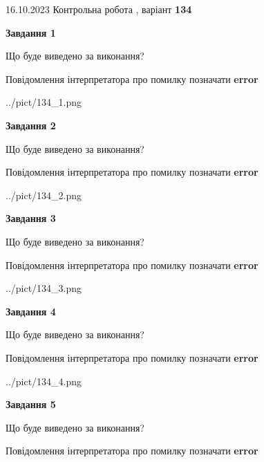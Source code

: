 \documentclass[12pt, ukrainian]{article}
\begin{document}
{\Large{16.10.2023 Контрольна робота , варіант  \No \textbf { 134 }\par}}
{
\begin {large}
{\begin {center}\textbf{Завдання 1}\end {center}}\par
Що буде виведено за виконання? \par
Повідомлення інтерпретатора про помилку позначати \textbf{error}

\begin{center}
	{../pict/134_1.png}
\end{center}
\newpage

{\begin {center}\textbf{Завдання 2}\end {center}}\par
Що буде виведено за виконання? \par
Повідомлення інтерпретатора про помилку позначати \textbf{error}

\begin{center}
	{../pict/134_2.png}
\end{center}
\newpage

{\begin {center}\textbf{Завдання 3}\end {center}}\par
Що буде виведено за виконання? \par
Повідомлення інтерпретатора про помилку позначати \textbf{error}

\begin{center}
	{../pict/134_3.png}
\end{center}
\newpage

{\begin {center}\textbf{Завдання 4}\end {center}}\par
Що буде виведено за виконання? \par
Повідомлення інтерпретатора про помилку позначати \textbf{error}

\begin{center}
	{../pict/134_4.png}
\end{center}
\newpage

{\begin {center}\textbf{Завдання 5}\end {center}}\par
Що буде виведено за виконання? \par
Повідомлення інтерпретатора про помилку позначати \textbf{error}


\end{large}}
\end{document}
